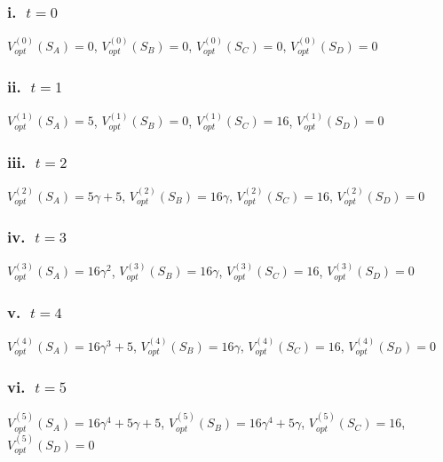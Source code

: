 \documentclass{article}
\begin{document}
\subsubsection*{i.$\mbox{ }t=0$}
\begin{center}
    $V_{opt}^{(0)}(S_A)=0$,
    $V_{opt}^{(0)}(S_B)=0$,
    $V_{opt}^{(0)}(S_C)=0$,
    $V_{opt}^{(0)}(S_D)=0$    
\end{center}

\subsubsection*{ii.$\mbox{ }t=1$}
\begin{center}
    $V_{opt}^{(1)}(S_A)=5$,
    $V_{opt}^{(1)}(S_B)=0$,
    $V_{opt}^{(1)}(S_C)=16$,
    $V_{opt}^{(1)}(S_D)=0$    
\end{center}

\subsubsection*{iii.$\mbox{ }t=2$}
\begin{center}
    $V_{opt}^{(2)}(S_A)=5\gamma+5$,
    $V_{opt}^{(2)}(S_B)=16\gamma$,
    $V_{opt}^{(2)}(S_C)=16$,
    $V_{opt}^{(2)}(S_D)=0$    
\end{center}

\subsubsection*{iv.$\mbox{ }t=3$}
\begin{center}
    $V_{opt}^{(3)}(S_A)=16\gamma^2$,
    $V_{opt}^{(3)}(S_B)=16\gamma$,
    $V_{opt}^{(3)}(S_C)=16$,
    $V_{opt}^{(3)}(S_D)=0$    
\end{center}

\subsubsection*{v.$\mbox{ }t=4$}
\begin{center}
    $V_{opt}^{(4)}(S_A)=16\gamma^3+5$,
    $V_{opt}^{(4)}(S_B)=16\gamma$,
    $V_{opt}^{(4)}(S_C)=16$,
    $V_{opt}^{(4)}(S_D)=0$    
\end{center}

\subsubsection*{vi.$\mbox{ }t=5$}
\begin{center}
    $V_{opt}^{(5)}(S_A)=16\gamma^4+5\gamma+5$,
    $V_{opt}^{(5)}(S_B)=16\gamma^4+5\gamma$,
    $V_{opt}^{(5)}(S_C)=16$,
    $V_{opt}^{(5)}(S_D)=0$    
\end{center}
\end{document}
